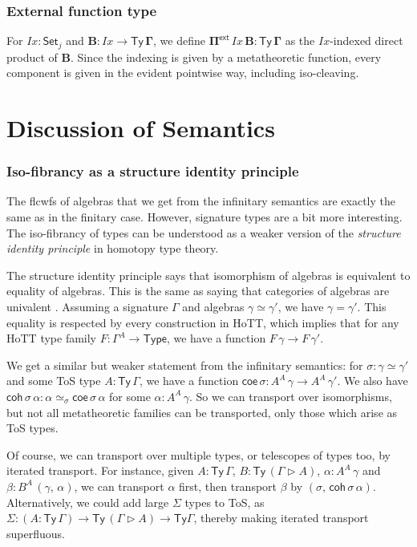 \documentclass[12pt,a4paper,twoside,openany]{book}
\theoremstyle{remark}
\theoremstyle{definition}
\theoremstyle{theorem}
\newcommand{\mi}[1]{\mathit{#1}}
\newcommand{\ms}[1]{\mathsf{#1}}
\newcommand{\bs}[1]{\boldsymbol{#1}}
\newcommand{\Ty}{\mathsf{Ty}}
\newcommand{\ra}{\rightarrow}
\newcommand{\Set}{\mathsf{Set}}
\newcommand{\ext}{\triangleright}
\newcommand{\Pie}{\Pi^{\mathsf{ext}}}
\newcommand{\bTy}{\bs{\Ty}}
\newcommand{\bGamma}{\bs{\Gamma}}
\newcommand{\bB}{\bs{B}}
\newcommand{\bPie}{\bs{\Pie}}
\newcommand{\coe}{\mathsf{coe}}
\newcommand{\coh}{\mathsf{coh}}
\begin{document}
\subsubsection{External function type}

For $\mi{Ix} : \Set_j$ and $\bB : \mi{Ix} \ra \bTy\,\bGamma$, we define $\bPie\,\mi{Ix}\,\bB
\bs{:} \bTy\,\bGamma$ as the $\mi{Ix}$-indexed direct product of $\bB$. Since the
indexing is given by a metatheoretic function, every component is given in the
evident pointwise way, including iso-cleaving.

\section{Discussion of Semantics}

\subsubsection{Iso-fibrancy as a structure identity principle}

The flcwfs of algebras that we get from the infinitary semantics are exactly the
same as in the finitary case. However, signature types are a bit more
interesting. The iso-fibrancy of types can be understood as a weaker version of
the \emph{structure identity principle} in homotopy type theory.

The structure identity principle says that isomorphism of algebras is equivalent
to equality of algebras. This is the same as saying that categories of algebras
are univalent \cite{univalent-categories}. Assuming a signature $\Gamma$ and
algebras $\gamma \simeq \gamma'$, we have $\gamma = \gamma'$. This equality is
respected by every construction in HoTT, which implies that for any HoTT type
family $F : \Gamma^A \to \ms{Type}$, we have a function $F\,\gamma \to
F\,\gamma'$.

We get a similar but weaker statement from the infinitary semantics: for $\sigma
: \gamma \simeq \gamma'$ and some ToS type $A : \Ty\,\Gamma$, we have a function
$\coe\,\sigma : A^A\,\gamma \to A^A\,\gamma'$. We also have
$\coh\,\sigma\,\alpha : \alpha \simeq_{\sigma} \coe\,\sigma\,\alpha$ for some
$\alpha : A^A\,\gamma$. So we can transport over isomorphisms, but not all
metatheoretic families can be transported, only those which arise as ToS types.

Of course, we can transport over multiple types, or telescopes of types too, by
iterated transport. For instance, given $A : \Ty\,\Gamma$, $B : \Ty\,(\Gamma
\ext A)$, $\alpha : A^A\,\gamma$ and $\beta : B^A\,(\gamma,\,\alpha)$, we can
transport $\alpha$ first, then transport $\beta$ by
$(\sigma,\,\coh\,\sigma\,\alpha)$.  Alternatively, we could add large $\Sigma$
types to ToS, as $\Sigma : (A : \Ty\,\Gamma) \to \Ty\,(\Gamma \ext A) \to \Ty
\Gamma$, thereby making iterated transport superfluous.
\end{document}
